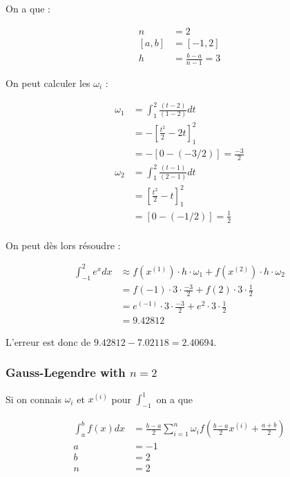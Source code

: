 On a que :

\begin{equation}
	\begin{aligned}
		n &= 2\\
		[a, b] &= [-1, 2]\\
		h &= \frac{b-a}{n-1} = 3
	\end{aligned}
\end{equation}

On peut calculer les $\omega_i$ :

\begin{equation}
	\begin{aligned}
		\omega_1 &= \int_1^2 \frac{(t-2)}{(1-2)} dt\\
		&= -\left [\frac{t^2}{2}-2t \right ]_1^2\\
		&= -\left [0 - (-3/2)\right] = \frac{-3}{2}\\
		\omega_2 &= \int_1^2 \frac{(t-1)}{(2-1)} dt\\
		&= \left [\frac{t^2}{2}-t \right ]_1^2\\
		&= \left [0 - (-1/2)\right] = \frac{1}{2}\\
	\end{aligned}
\end{equation}

On peut dès lors résoudre :

\begin{equation}
	\begin{aligned}
		\int_{-1}^2 e^x dx &\approx f(x^{(1)}) \cdot h \cdot \omega_1 + f(x^{(2)}) \cdot h \cdot \omega_2\\
		&= f(-1) \cdot 3 \cdot \frac{-3}{2} + f(2) \cdot 3 \cdot \frac{1}{2}\\
		&= e^{(-1)} \cdot 3 \cdot \frac{-3}{2} + e^2 \cdot 3 \cdot \frac{1}{2}\\
		&= 9.42812
	\end{aligned}
\end{equation}

L'erreur est donc de $9.42812 - 7.02118 = 2.40694$.

\subsubsection{Gauss-Legendre with $n = 2$}

Si on connais $\omega_i$ et $x^{(i)}$ pour $\int_{-1}^1$ on a que

\begin{equation}
	\begin{aligned}
		\int_a^b f(x) dx &= \frac{b-a}{2} \sum_{i=1}^n \omega_i f\left(\frac{b-a}{2}x^{(i)}+\frac{a+b}{2}\right)\\
		a &= -1\\
		b &= 2\\
		n &= 2
	\end{aligned}
\end{equation}

